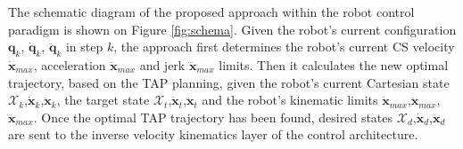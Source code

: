 The schematic diagram of the proposed approach within the robot control paradigm is shown on Figure \ref{fig:schema}. Given the robot's current configuration $\bm{q}_k$, $\dot{\bm{q}}_k$, $\ddot{\bm{q}}_k$ in step $k$, the approach first determines the robot's current CS velocity $\dot{\bm{x}}_{max}$, acceleration $\ddot{\bm{x}}_{max}$ and jerk $\dddot{\bm{x}}_{max}$ limits. Then it calculates the new optimal trajectory, based on the TAP planning, given the robot's current Cartesian state $\mathcal{X}_k$,$\dot{\bm{x}}_k$,$\ddot{\bm{x}}_k$, the target state $\mathcal{X}_t$,$\dot{\bm{x}}_t$,$\ddot{\bm{x}}_t$ and the robot's kinematic limits $\dot{\bm{x}}_{max}$,$\ddot{\bm{x}}_{max}$,$\dddot{\bm{x}}_{max}$. 
Once the optimal TAP trajectory has been found, desired states $\mathcal{X}_{d}$,$\dot{\bm{x}}_d$,$\ddot{\bm{x}}_d$ are sent to the inverse velocity kinematics layer of the control architecture. 

